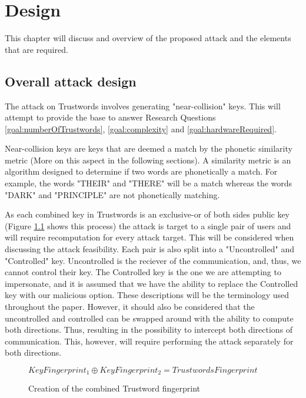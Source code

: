 \chapter{Design}
\label{cha:Design}

This chapter will discuss and overview of the proposed attack and the elements that are required.

\section{Overall attack design}

The attack on Trustwords involves generating "near-collision" keys. 
This will attempt to provide the base to answer Research Questions \ref{goal:numberOfTrustwords}, \ref{goal:complexity} and \ref{goal:hardwareRequired}.

Near-collision keys are keys that are deemed a match by the phonetic similarity metric (More on this aspect in the following sections). A similarity metric is an algorithm designed to determine if two words are phonetically a match. For example, the words "THEIR" and "THERE" will be a match whereas the words "DARK" and "PRINCIPLE" are not phonetically matching.

As each combined key in Trustwords is an exclusive-or of both sides public key (Figure \ref{fig:xor_trustwords} shows this process) the attack is target to a single pair of users and will require recomputation for every attack target. This will be considered when discussing the attack feasibility. Each pair is also split into a "Uncontrolled" and "Controlled" key. Uncontrolled is the reciever of the communication, and, thus, we cannot control their key. The Controlled key is the one we are attempting to impersonate, and it is assumed that we have the ability to replace the Controlled key with our malicious option. These descriptions will be the terminology used throughout the paper. However, it should also be considered that the uncontrolled and controlled can be swapped around with the ability to compute both directions. Thus, resulting in the possibility to intercept both directions of communication. This, however, will require performing the attack separately for both directions.

\begin{figure}[h!]
    \centering
    $KeyFingerprint_{1} \oplus KeyFingerprint_{2} = TrustwordsFingerprint$
    \caption{Creation of the combined Trustword fingerprint}
    \label{fig:xor_trustwords}
\end{figure}

